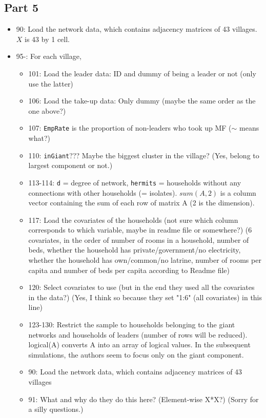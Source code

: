 \documentclass[10pt,letterpaper]{article}
\begin{document}
\subsection*{Part 5}
\begin{itemize}
  \item 90: Load the network data, which contains adjacency matrices of 43 villages. $X$ is 43 by 1 cell.
  \item 95-: For each village,
    \begin{itemize}
      \item 101: Load the leader data: ID and dummy of being a leader or not (only use the latter)
      \item 106: Load the take-up data: Only dummy (maybe the same order as the one above?)
      \item 107: \texttt{EmpRate} is the proportion of non-leaders who took up MF ($\sim$ means what?)
      \item 110: \texttt{inGiant}??? 
        Maybe the biggest cluster in the village? (Yes, belong to largest component or not.)
      \item 113-114: \texttt{d} = degree of network, \texttt{hermits} = households without any connections with other households (= isolates). $sum(A,2)$ is a column vector containing the sum of each row of matrix A (2 is the dimension).
      \item 117: Load the covariates of the households (not sure which column corresponds to which variable, maybe in readme file or somewhere?) (6 covariates, in the order of number of rooms in a household, number of beds, whether the household has private/government/no electricity, whether the household has own/common/no latrine, number of rooms per capita and number of beds per capita according to Readme file)
      \item 120: Select covariates to use (but in the end they used all the covariates in the data?) (Yes, I think so because they set "1:6" (all covariates) in this line)
      \item 123-130: Restrict the sample to households belonging to the giant networks and households of leaders (number of rows will be reduced). logical(A) converts A into an array of logical values. In the subsequent simulations, the authors seem to focus only on the giant component.
  \item 90: Load the network data, which contains adjacency matrices of 43 villages
  \item 91: What and why do they do this here? (Element-wise X*X?) (Sorry for a silly questions.)

\end{itemize}
\end{itemize}
\end{document}
